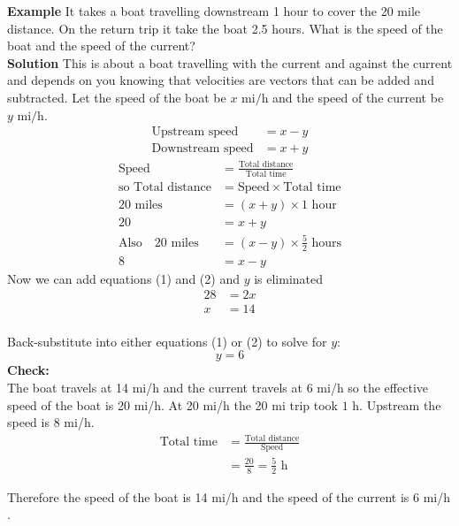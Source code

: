  \textbf{Example} It takes a boat travelling downstream 1 hour to cover the 20 mile distance. On the return trip it take the boat 2.5 hours. What is the speed of the boat and the speed of the current?\\
 \textbf{Solution} This is about a boat travelling with the current and against the current and depends on you knowing that velocities are vectors that can be added and subtracted. Let the speed of the boat be $x$ \mbox{mi}$/$\mbox{h} and the speed of the current be $y$ \mbox{mi}$/$\mbox{h}. 
 	\begin{align*}\text{Upstream speed} &  =  x -y \\
 	\text{Downstream speed} &  =  x +y\end{align*}
 	\begin{align}\text{Speed} &  =  \frac{\text{Total distance}}{\text{Total time}} \nonumber  \\
 	\text{so Total distance} &  =  \text{Speed} \times \text{Total time} \nonumber  \\
 	20 \textrm{ miles } &  =  \left (x +y\right ) \times 1 \textrm{ hour} \nonumber  \\
 	20 &=x +y \tag{1} \\
 	\text{Also}\quad 20 \textrm{ miles }&  =  \left (x -y\right ) \times \frac{5}{2} \textrm{ hours}\nonumber  \\
 	8 &=x -y \tag{2}\end{align}
 Now we can add equations (1) and (2) and $y$ is eliminated
 \begin{align*}28 &  =  2 x \\
 x &  =  14\end{align*} \\
 Back-substitute into either equations (1) or (2) to solve for $y$:
$$ y =  6$$
 \textbf{Check:} \\\relax The boat travels
 at 14 $\mbox{mi}$/$\mbox{h}$ and the current travels at 6 $\mbox{mi}$/$\mbox{h}$ so the effective speed of the
 boat is 20 $\mbox{mi}$/$\mbox{h}$. At 20 $\mbox{mi}$/$\mbox{h}$ the 20 $\mbox{mi}$ trip took $1$ $\mbox{h}$. Upstream the speed is 8 $\mbox{mi}$/$\mbox{h}$. \
 \begin{align*}\text{Total time} &  =  \frac{\text{Total distance}}{\text{Speed}} \\
 &  =  \frac{20}{8} =\frac{5}{2} \text{ h}\end{align*}
 
 Therefore the speed of the boat is 14 $\mbox{mi}$/$\mbox{h}$ and the speed of the current is 6 $\mbox{mi}$/$\mbox{h}$. 
 

